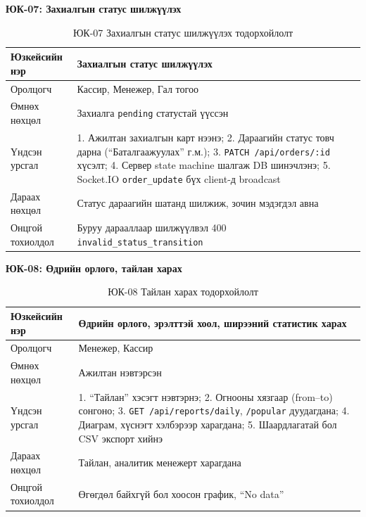 \textbf{ЮК-07: Захиалгын статус шилжүүлэх}

\begin{table}[htbp]
\caption{ЮК-07 Захиалгын статус шилжүүлэх тодорхойлолт}
\label{tab:uc07}
\centering
\small
\begin{tabularx}{\textwidth}{|L|L|}
\hline
{}
Юзкейсийн нэр & Захиалгын статус шилжүүлэх \\ \hline
Оролцогч & Кассир, Менежер, Гал тогоо \\ \hline
{}
Өмнөх нөхцөл & Захиалга \texttt{pending} статустай үүссэн \\ \hline
Үндсэн урсгал & 1. Ажилтан захиалгын карт нээнэ;
  2. Дараагийн статус товч дарна (``Баталгаажуулах'' г.м.);
  3. \texttt{PATCH /api/orders/:id} хүсэлт;
  4. Сервер state machine шалгаж DB шинэчлэнэ;
  5. Socket.IO \texttt{order\_update} бүх client-д broadcast \\ \hline
{}
Дараах нөхцөл & Статус дараагийн шатанд шилжиж, зочин мэдэгдэл авна \\ \hline
Онцгой тохиолдол & Буруу дарааллаар шилжүүлвэл 400 \texttt{invalid\_status\_transition} \\ \hline
\end{tabularx}
\end{table}

\textbf{ЮК-08: Өдрийн орлого, тайлан харах}

\begin{table}[htbp]
\caption{ЮК-08 Тайлан харах тодорхойлолт}
\label{tab:uc08}
\centering
\small
\begin{tabularx}{\textwidth}{|L|L|}
\hline
{}
Юзкейсийн нэр & Өдрийн орлого, эрэлттэй хоол, ширээний статистик харах \\ \hline
Оролцогч & Менежер, Кассир \\ \hline
{}
Өмнөх нөхцөл & Ажилтан нэвтэрсэн \\ \hline
Үндсэн урсгал & 1. ``Тайлан'' хэсэгт нэвтэрнэ;
  2. Огнооны хязгаар (from--to) сонгоно;
  3. \texttt{GET /api/reports/daily}, \texttt{/popular} дуудагдана;
  4. Диаграм, хүснэгт хэлбэрээр харагдана;
  5. Шаардлагатай бол CSV экспорт хийнэ \\ \hline
{}
Дараах нөхцөл & Тайлан, аналитик менежерт харагдана \\ \hline
Онцгой тохиолдол & Өгөгдөл байхгүй бол хоосон график, ``No data'' \\ \hline
\end{tabularx}
\end{table}

